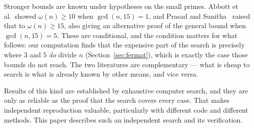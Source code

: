 \documentclass[11pt]{amsart}
\theoremstyle{remark}
\begin{document}
Stronger bounds are known under hypotheses on the small primes. Abbott et
al.\ showed $\omega(n) \ge 10$ when $\gcd(n, 15) = 1$, and Prasad and
Sunitha~\cite{prasad} raised that to $\omega(n) \ge 15$, also giving an
alternative proof of the general bound when $\gcd(n, 15) = 5$. These are
conditional, and the condition matters for what follows: our computation finds
that the expensive part of the search is precisely where $3$ and $5$ \emph{do}
divide $n$ (Section~\ref{sec:fermat}), which is exactly the case those bounds do
not reach. The two literatures are complementary --- what is cheap to search is
what is already known by other means, and vice versa.

Results of this kind are established by exhaustive computer search, and they
are only as reliable as the proof that the search covers every case. That makes
independent reproduction valuable, particularly with different code and
different methods. This paper describes such an independent search and its
verification.
\end{document}
